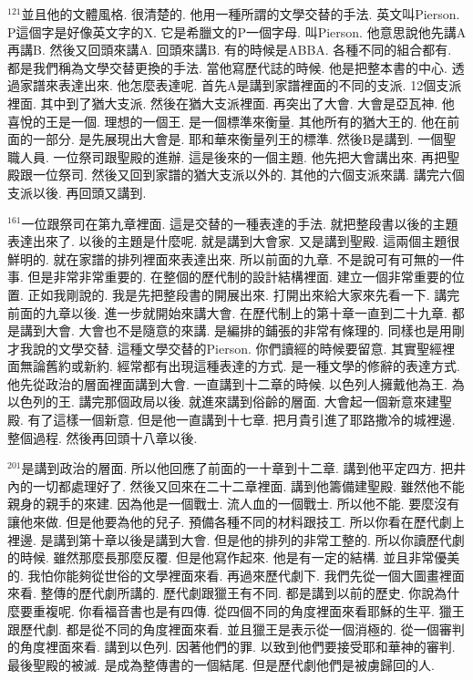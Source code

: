 \documentclass{book}
\begin{document}
$^{121}$並且他的文體風格.
很清楚的.
他用一種所謂的文學交替的手法.
英文叫Pierson.
P這個字是好像英文字的X.
它是希臘文的P一個字母.
叫Pierson.
他意思說他先講A再講B.
然後又回頭來講A.
回頭來講B.
有的時候是ABBA.
各種不同的組合都有.
都是我們稱為文學交替更換的手法.
當他寫歷代誌的時候.
他是把整本書的中心.
透過家譜來表達出來.
他怎麼表達呢.
首先A是講到家譜裡面的不同的支派.
12個支派裡面.
其中到了猶大支派.
然後在猶大支派裡面.
再突出了大會.
大會是亞瓦神.
他喜悅的王是一個.
理想的一個王.
是一個標準來衡量.
其他所有的猶大王的.
他在前面的一部分.
是先展現出大會是.
耶和華來衡量列王的標準.
然後B是講到.
一個聖職人員.
一位祭司跟聖殿的進辦.
這是後來的一個主題.
他先把大會講出來.
再把聖殿跟一位祭司.
然後又回到家譜的猶大支派以外的.
其他的六個支派來講.
講完六個支派以後.
再回頭又講到.

$^{161}$一位跟祭司在第九章裡面.
這是交替的一種表達的手法.
就把整段書以後的主題表達出來了.
以後的主題是什麼呢.
就是講到大會家.
又是講到聖殿.
這兩個主題很鮮明的.
就在家譜的排列裡面來表達出來.
所以前面的九章.
不是說可有可無的一件事.
但是非常非常重要的.
在整個的歷代制的設計結構裡面.
建立一個非常重要的位置.
正如我剛說的.
我是先把整段書的開展出來.
打開出來給大家來先看一下.
講完前面的九章以後.
進一步就開始來講大會.
在歷代制上的第十章一直到二十九章.
都是講到大會.
大會也不是隨意的來講.
是編排的鋪張的非常有條理的.
同樣也是用剛才我說的文學交替.
這種文學交替的Pierson.
你們讀經的時候要留意.
其實聖經裡面無論舊約或新約.
經常都有出現這種表達的方式.
是一種文學的修辭的表達方式.
他先從政治的層面裡面講到大會.
一直講到十二章的時候.
以色列人擁戴他為王.
為以色列的王.
講完那個政局以後.
就進來講到俗齡的層面.
大會起一個新意來建聖殿.
有了這樣一個新意.
但是他一直講到十七章.
把月貴引進了耶路撒冷的城裡邊.
整個過程.
然後再回頭十八章以後.

$^{201}$是講到政治的層面.
所以他回應了前面的一十章到十二章.
講到他平定四方.
把井內的一切都處理好了.
然後又回來在二十二章裡面.
講到他籌備建聖殿.
雖然他不能親身的親手的來建.
因為他是一個戰士.
流人血的一個戰士.
所以他不能.
要麼沒有讓他來做.
但是他要為他的兒子.
預備各種不同的材料跟技工.
所以你看在歷代劇上裡邊.
是講到第十章以後是講到大會.
但是他的排列的非常工整的.
所以你讀歷代劇的時候.
雖然那麼長那麼反覆.
但是他寫作起來.
他是有一定的結構.
並且非常優美的.
我怕你能夠從世俗的文學裡面來看.
再過來歷代劇下.
我們先從一個大圖畫裡面來看.
整傳的歷代劇所講的.
歷代劇跟獵王有不同.
都是講到以前的歷史.
你說為什麼要重複呢.
你看福音書也是有四傳.
從四個不同的角度裡面來看耶穌的生平.
獵王跟歷代劇.
都是從不同的角度裡面來看.
並且獵王是表示從一個消極的.
從一個審判的角度裡面來看.
講到以色列.
因著他們的罪.
以致到他們要接受耶和華神的審判.
最後聖殿的被滅.
是成為整傳書的一個結尾.
但是歷代劇他們是被虜歸回的人.
\end{document}
